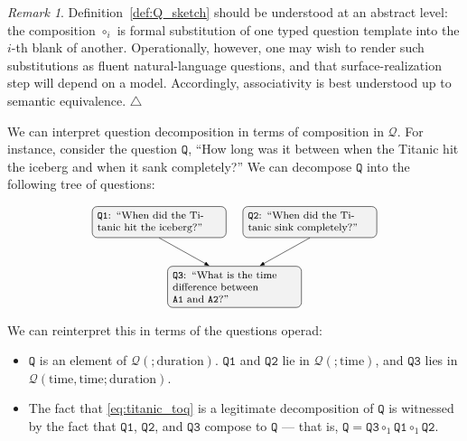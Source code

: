 \documentclass{article}
\theoremstyle{plain}
\theoremstyle{definition}
\theoremstyle{remark}
\newtheorem{remark}[theorem]{Remark}
\theoremstyle{definition}
\newcommand\cQ{\mathcal{Q}}
\begin{document}
\begin{remark}
Definition~\ref{def:Q_sketch} should be understood at an abstract level: the composition $\circ_i$ is formal substitution of one typed question template into the $i$-th blank of another.
Operationally, however, one may wish to render such substitutions as fluent natural-language questions, and that surface-realization step will depend on a model.
Accordingly, associativity is best understood up to semantic equivalence.
\null\hfill$\triangle$
\end{remark}

We can interpret question decomposition in terms of composition in $\cQ$.
For instance, consider the question $\mathtt{Q}$, ``How long was it between when the Titanic hit the iceberg and when it sank completely?''
We can decompose $\mathtt{Q}$ into the following tree of questions:

\begin{equation}
\label{eq:titanic_toq}
\footnotesize
\begin{tikzpicture}[
  >={Latex[length=1.5mm]},
  bubble/.style={
    draw, rounded corners=4pt, align=left,
    fill=black!5, inner sep=4pt, text width=3.45cm
  },
  baseline={(current bounding box.center)}
]

\node[bubble] at (0,0) (q3) {%
$\mathtt{Q3}$: ``What is the time difference between\\
  $\mathtt{A1}$ and $\mathtt{A2}$?''
};

\node[bubble] at (-2.1,1.8) (q1) {%
  $\mathtt{Q1}$: ``When did the Titanic hit the iceberg?''
};

\node[bubble] at (2.1,1.8) (q2) {%
  $\mathtt{Q2}$: ``When did the Titanic sink completely?''
};

\draw[->] (q1.south) -- (q3.140);
\draw[->] (q2.south) -- (q3.40);

\end{tikzpicture}
\end{equation}

We can reinterpret this in terms of the questions operad:
\begin{itemize}
\item $\mathtt{Q}$ is an element of $\cQ(;\text{duration})$.
$\mathtt{Q1}$ and $\mathtt{Q2}$ lie in $\cQ(;\text{time})$, and $\mathtt{Q3}$ lies in $\cQ(\text{time},\text{time};\text{duration})$.

\item The fact that \eqref{eq:titanic_toq} is a legitimate decomposition of $\mathtt{Q}$ is witnessed by the fact that $\mathtt{Q1}$, $\mathtt{Q2}$, and $\mathtt{Q3}$ compose to $\mathtt{Q}$ --- that is, $\mathtt{Q} = \mathtt{Q3} \circ_1 \mathtt{Q1} \circ_1 \mathtt{Q2}$.
\end{itemize}
\end{document}
